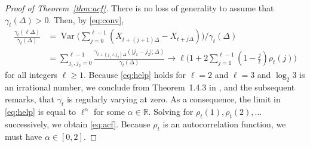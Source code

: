 \documentclass[ecta,nameyear,draft]{econsocart}
\newcommand{\1}{\mathbf 1}
\DeclareMathOperator{\Var}{Var}
\numberwithin{equation}{section}
\begin{document}
\begin{appendix}
\begin{proof}[Proof of Theorem~\ref{thm:acf}]
	There is no loss of generality to assume that $\gamma_t (\Delta)>0$. 
	Then, by \eqref{eq:conv},
	\begin{equation}\label{eq:help}\begin{split}
			\frac{\gamma_t (\ell\Delta)}{\gamma_t (\Delta)}	&= \Var\Biggl(\sum_{j=0}^{\ell-1} (X_{t+(j+1)\Delta}-X_{t+j\Delta})\Biggr)\Bigg/\gamma_t (\Delta) \\
			&=\sum_{j_1,j_2=0}^{\ell-1} \frac{\gamma_{t+(j_1\wedge j_2)\Delta}(\lvert j_1-j_2\rvert;\Delta)}{\gamma_t (\Delta)} \to %
			\ell\biggl(1+2\sum_{j=1}^{\ell-1} (1-\tfrac j\ell) \rho_t(j)\biggr)
	\end{split}\end{equation}
	for all integers $\ell\geq1$. Because \eqref{eq:help} holds for $\ell=2$ and $\ell=3$ and   $\log_2 3$ is an irrational number, we conclude from Theorem~1.4.3 in \cite{BGT}, and the subsequent remarks, that $\gamma_t$ is regularly varying at zero. As a consequence, the limit in \eqref{eq:help} is equal to $\ell^\alpha$ for some $\alpha\in\mathbb{R}$. Solving for $\rho_t(1), \rho_t(2),\ldots$ successively, we obtain \eqref{eq:acf}. Because $\rho_t$ is an autocorrelation function, we must have $\alpha\in[0,2]$.

\end{proof}
\end{appendix}
\end{document}
